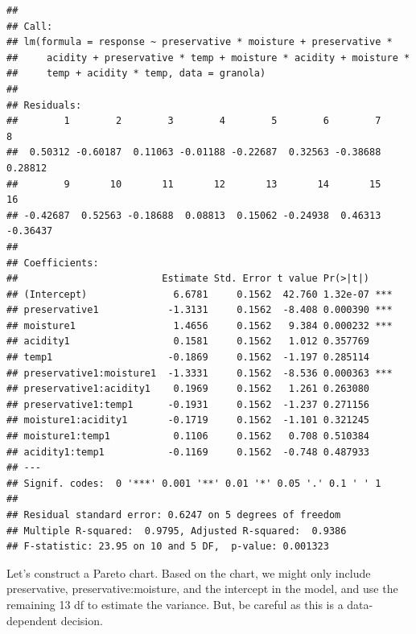 \documentclass[
]{book}
\begin{document}
\begin{verbatim}
## 
## Call:
## lm(formula = response ~ preservative * moisture + preservative * 
##     acidity + preservative * temp + moisture * acidity + moisture * 
##     temp + acidity * temp, data = granola)
## 
## Residuals:
##        1        2        3        4        5        6        7        8 
##  0.50312 -0.60187  0.11063 -0.01188 -0.22687  0.32563 -0.38688  0.28812 
##        9       10       11       12       13       14       15       16 
## -0.42687  0.52563 -0.18688  0.08813  0.15062 -0.24938  0.46313 -0.36437 
## 
## Coefficients:
##                         Estimate Std. Error t value Pr(>|t|)    
## (Intercept)               6.6781     0.1562  42.760 1.32e-07 ***
## preservative1            -1.3131     0.1562  -8.408 0.000390 ***
## moisture1                 1.4656     0.1562   9.384 0.000232 ***
## acidity1                  0.1581     0.1562   1.012 0.357769    
## temp1                    -0.1869     0.1562  -1.197 0.285114    
## preservative1:moisture1  -1.3331     0.1562  -8.536 0.000363 ***
## preservative1:acidity1    0.1969     0.1562   1.261 0.263080    
## preservative1:temp1      -0.1931     0.1562  -1.237 0.271156    
## moisture1:acidity1       -0.1719     0.1562  -1.101 0.321245    
## moisture1:temp1           0.1106     0.1562   0.708 0.510384    
## acidity1:temp1           -0.1169     0.1562  -0.748 0.487933    
## ---
## Signif. codes:  0 '***' 0.001 '**' 0.01 '*' 0.05 '.' 0.1 ' ' 1
## 
## Residual standard error: 0.6247 on 5 degrees of freedom
## Multiple R-squared:  0.9795, Adjusted R-squared:  0.9386 
## F-statistic: 23.95 on 10 and 5 DF,  p-value: 0.001323
\end{verbatim}

Let's construct a Pareto chart. Based on the chart, we might only include preservative, preservative:moisture, and the intercept in the model, and use the remaining 13 df to estimate the variance. But, be careful as this is a data-dependent decision.
\end{document}
